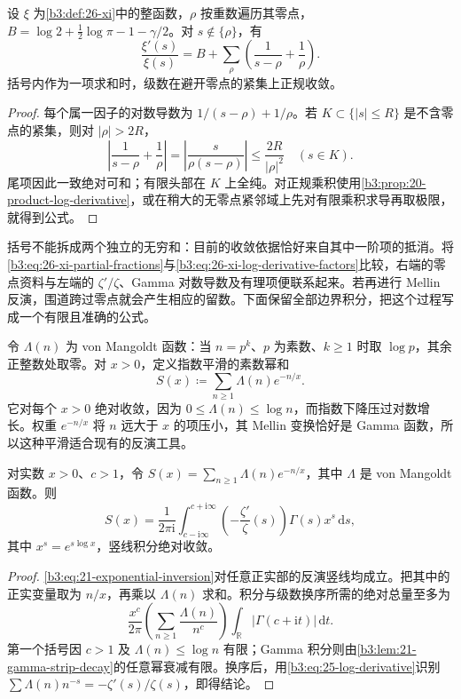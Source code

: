 \begin{proposition}[xi 函数的部分分式]\label{b3:prop:26-xi-log-derivative}
设 \(\xi\) 为\cref{b3:def:26-xi}中的整函数，\(\rho\) 按重数遍历其零点，\(B=\log2+\tfrac12\log\pi-1-\gamma/2\)。对 \(s\notin\{\rho\}\)，有
\begin{equation}\label{b3:eq:26-xi-partial-fractions}
 \frac{\xi'(s)}{\xi(s)}
 =B+\sum_\rho\left(\frac1{s-\rho}+\frac1\rho\right).
\end{equation}
括号内作为一项求和时，级数在避开零点的紧集上正规收敛。
\end{proposition}
\begin{proof}
每个属一因子的对数导数为 \(1/(s-\rho)+1/\rho\)。若 \(K\subset\{|s|\le R\}\) 是不含零点的紧集，则对 \(|\rho|>2R\)，
\[
 \left|\frac1{s-\rho}+\frac1\rho\right|
 =\left|\frac{s}{\rho(s-\rho)}\right|
 \le\frac{2R}{|\rho|^2}\quad(s\in K).
\]
尾项因此一致绝对可和；有限头部在 \(K\) 上全纯。对正规乘积使用\cref{b3:prop:20-product-log-derivative}，或在稍大的无零点紧邻域上先对有限乘积求导再取极限，就得到公式。
\end{proof}

括号不能拆成两个独立的无穷和：目前的收敛依据恰好来自其中一阶项的抵消。将\eqref{b3:eq:26-xi-partial-fractions}与\eqref{b3:eq:26-xi-log-derivative-factors}比较，右端的零点资料与左端的 \(\zeta'/\zeta\)、Gamma 对数导数及有理项便联系起来。若再进行 Mellin 反演，围道跨过零点就会产生相应的留数。下面保留全部边界积分，把这个过程写成一个有限且准确的公式。

\ProseParagraphBreak
令 \(\Lambda(n)\) 为 von Mangoldt 函数：当 \(n=p^k\)、\(p\) 为素数、\(k\ge1\) 时取 \(\log p\)，其余正整数处取零。对 \(x>0\)，定义指数平滑的素数幂和
\[
 S(x)\coloneqq\sum_{n\ge1}\Lambda(n)e^{-n/x}.
\]
它对每个 \(x>0\) 绝对收敛，因为 \(0\le\Lambda(n)\le\log n\)，而指数下降压过对数增长。权重 \(e^{-n/x}\) 将 \(n\) 远大于 \(x\) 的项压小，其 Mellin 变换恰好是 Gamma 函数，所以这种平滑适合现有的反演工具。

\begin{proposition}\label{b3:prop:26-smoothed-prime-inversion}
对实数 \(x>0\)、\(c>1\)，令 \(S(x)=\sum_{n\ge1}\Lambda(n)e^{-n/x}\)，其中 \(\Lambda\) 是 von Mangoldt 函数。则
\begin{equation}\label{b3:eq:26-smoothed-prime-inversion}
 S(x)=\frac1{2\pi\mathrm i}
       \int_{c-\mathrm i\infty}^{c+\mathrm i\infty}
       \left(-\frac{\zeta'}{\zeta}(s)\right)\Gamma(s)x^s\,\mathrm ds,
\end{equation}
其中 \(x^s=e^{s\log x}\)，竖线积分绝对收敛。
\end{proposition}
\begin{proof}
\eqref{b3:eq:21-exponential-inversion}对任意正实部的反演竖线均成立。把其中的正实变量取为 \(n/x\)，再乘以 \(\Lambda(n)\) 求和。积分与级数换序所需的绝对总量至多为
\[
 \frac{x^c}{2\pi}
 \left(\sum_{n\ge1}\frac{\Lambda(n)}{n^c}\right)
 \int_{\mathbb R}|\Gamma(c+\mathrm it)|\,\mathrm dt.
\]
第一个括号因 \(c>1\) 及 \(\Lambda(n)\le\log n\) 有限；Gamma 积分则由\cref{b3:lem:21-gamma-strip-decay}的任意幂衰减有限。换序后，用\eqref{b3:eq:25-log-derivative}识别 \(\sum\Lambda(n)n^{-s}=-\zeta'(s)/\zeta(s)\)，即得结论。
\end{proof}

